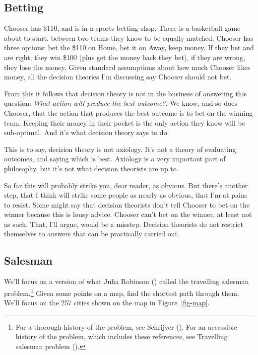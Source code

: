 \documentclass[
  10pt,
  letterpaper,
  DIV=11,
  numbers=noendperiod,
  twoside]{scrartcl}
\begin{document}
\subsection{Betting}\label{betting}

Chooser has \$110, and is in a sports betting shop. There is a
basketball game about to start, between two teams they know to be
equally matched. Chooser has three options: bet the \$110 on Home, bet
it on Away, keep money. If they bet and are right, they win \$100 (plus
get the money back they bet), if they are wrong, they lose the money.
Given standard assumptions about how much Chooser likes money, all the
decision theories I'm discussing say Chooser should not bet.

From this it follows that decision theory is not in the business of
answering this question: \emph{What action will produce the best
outcome?}. We know, and so does Chooser, that the action that produces
the best outcome is to bet on the winning team. Keeping their money in
their pocket is the only action they know will be sub-optimal. And it's
what decision theory says to do.

This is to say, decision theory is not axiology. It's not a theory of
evaluating outcomes, and saying which is best. Axiology is a very
important part of philosophy, but it's not what decision theorists are
up to.

So far this will probably strike you, dear reader, as obvious. But
there's another step, that I think will strike some people as nearly as
obvious, that I'm at pains to resist. Some might say that decision
theorists don't tell Chooser to bet on the winner because this is lousy
advice. Chooser can't bet on the winner, at least not as such. That,
I'll argue, would be a misstep. Decision theorists do not restrict
themselves to answers that can be practically carried out.

\subsection{Salesman}\label{salesman}

We'll focus on a version of what Julia Robinson
() called the travelling salesman
problem.\footnote{For a thorough history of the problem, see Schrijver
  (). For an accessible history of the
  problem, which includes these references, see Travelling salesman
  problem ().} Given some points on a
map, find the shortest path through them. We'll focus on the 257 cities
shown on the map in Figure~\ref{fig-map}.
\end{document}
